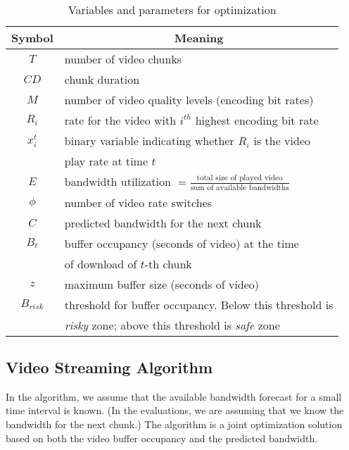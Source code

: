 \begin{table} [bt]
\small
\begin{tabular} {|c |l |}
\hline
\textbf{Symbol}&\multicolumn{1}{c|}{\textbf{Meaning} }\\ \hline
$T$ &number of video chunks  \\ \hline
$CD$ & chunk duration  \\ \hline
$M$ &number of video quality levels (encoding bit rates)\\ \hline
$R_i$& rate for the video with $i^{th}$ highest encoding bit rate \\ \hline
$x_i^t$& binary variable indicating whether $R_i$ is the video \\
& play rate at time $t$ \\ \hline
$E$& bandwidth utilization $= \frac{\mbox{total size of played
    video}}{\mbox{sum of available bandwidths}}$ \\ \hline
$\phi$ &number of video rate switches \\ \hline
$C $ & predicted bandwidth for the next chunk\\ \hline
$B_t $ & buffer occupancy (seconds of video) at the time \\
     & of download of $t$-th chunk \\ \hline
$z $ &maximum buffer size (seconds of video) \\ \hline
$B_{risk} $ & threshold for buffer occupancy. Below this threshold is\\
& \emph{risky} zone; above this threshold is \emph{safe} zone \\ \hline
\end{tabular}
\centering
\caption{Variables and parameters for optimization}
\label{tab:notation}
\end{table}
\subsection{Video Streaming Algorithm} \label{subsec:online}

In the algorithm, we assume that the available bandwidth forecast for
a small time interval is known.
(In the evaluations, we are assuming that we know the bandwidth for
the next chunk.)
The algorithm is a joint optimization
solution based on both the video buffer occupancy and the predicted bandwidth. 


